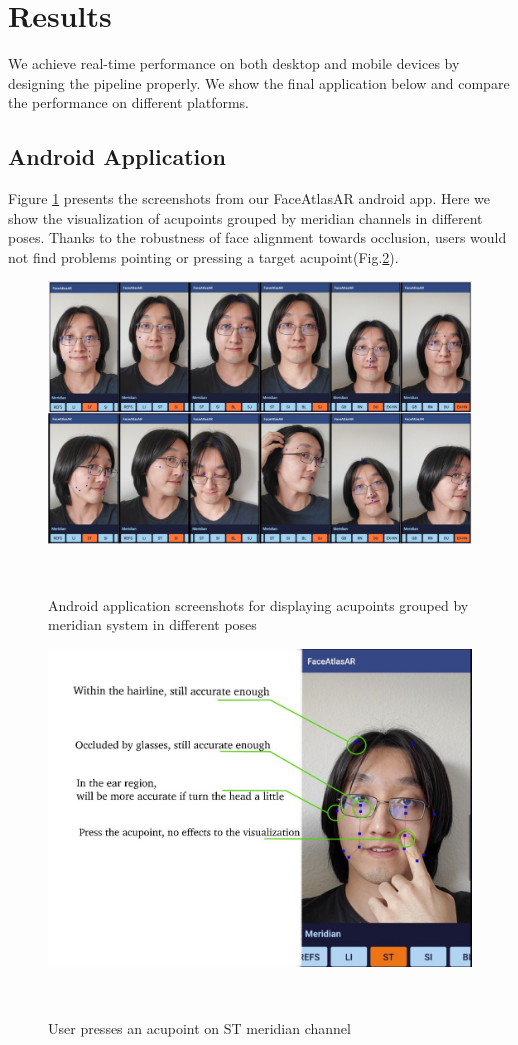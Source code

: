 \section{Results}
\label{sec:results}
We achieve real-time performance on both desktop and mobile devices by designing the pipeline properly. We show the final application below and compare the performance on different platforms.

\subsection{Android Application}
\label{sec:res-android-app}
Figure \ref{fig:res} presents the screenshots from our FaceAtlasAR android app. Here we show the visualization of acupoints grouped by meridian channels in different poses. Thanks to the robustness of face alignment towards occlusion, users would not find problems pointing or pressing a target acupoint(Fig.\ref{fig:press}).
\begin{figure}
  \centering
    \includegraphics[width=\columnwidth]{figures/res.png}
    \caption{Android application screenshots for displaying acupoints grouped by meridian system in different poses}~\label{fig:res}
  \end{figure}
\begin{figure}
  \centering
    \includegraphics[width=\columnwidth]{figures/press-acu.jpg}
    \caption{User presses an acupoint on ST meridian channel}~\label{fig:press}
  \end{figure}

